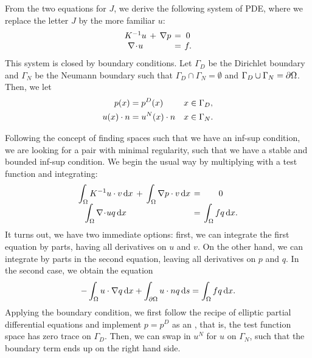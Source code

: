 \begin{intro}
  From the two equations for $J$, we derive the following system of
  PDE, where we replace the letter $J$ by the more familiar $u$:
  \begin{gather}
    \label{eq:darcy:5}
    \arraycolsep2pt
    \begin{matrix}
      K^{-1} u &+& \nabla p &=& 0 \\
      \div u &&&=& f.
    \end{matrix}
  \end{gather}
  This system is closed by boundary conditions. Let $\Gamma_D$ be the
  Dirichlet boundary and $\Gamma_N$ be the Neumann boundary such that
  $\Gamma_D \cap \Gamma_N = \emptyset$ and
  $\Gamma_D\cup\Gamma_N = \partial\Omega$. Then, we let
  \begin{gather}
    \label{eq:darcy:6}
    \begin{aligned}
      p(x) &= p^D(x) & x & \in \Gamma_D, \\
      u(x)\cdot n &= u^N(x)\cdot n & x & \in \Gamma_N.
    \end{aligned}
  \end{gather}

  Following the concept of finding spaces such that we have an inf-sup
  condition, we are looking for a pair with minimal regularity, such
  that we have a stable and bounded inf-sup condition. We begin the
  usual way by multiplying with a test function and integrating:
  \begin{gather}
    \label{eq:darcy:7}
    \arraycolsep2pt
    \begin{matrix}
      \displaystyle\int_\domain K^{-1} u\cdot v\dx
      &+&
      \displaystyle\int_\domain \nabla p \cdot v\dx
      &=& 0 \\
      \displaystyle\int_\domain \div u q\dx
      &&&=&
      \displaystyle\int_\domain f q\dx.
    \end{matrix}
  \end{gather}
  It turns out, we have two immediate options: first, we can integrate
  the first equation by parts, having all derivatives on $u$ and $v$.
  On the other hand, we can integrate by parts in the second equation,
  leaving all derivatives on $p$ and $q$. In the second case,
  we obtain the equation
  \begin{gather*}
    -\int_\Omega u\cdot\nabla q\,\mathrm{d} x + \int_{\partial\Omega} u\cdot n q \,\mathrm{d} s
    = \int_\Omega f q\,\mathrm{d} x.
  \end{gather*}
  Applying the boundary condition, we first follow the recipe of
  elliptic partial differential equations and implement $p=p^D$ as an
  , that is, the test function
  space has zero trace on $\Gamma_D$. Then, we can swap in $u^N$ for
  $u$ on $\Gamma_N$, such that the boundary term ends up on the right
  hand side.
\end{intro}

